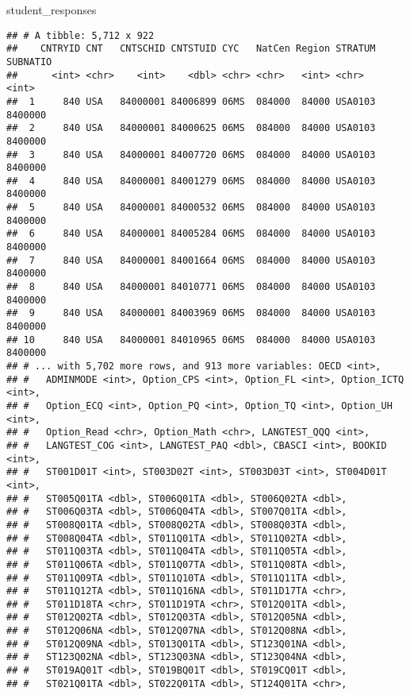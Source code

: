 \documentclass[]{article}
\newenvironment{Shaded}{\begin{snugshade}}{\end{snugshade}}
\newcommand{\NormalTok}[1]{#1}
\begin{document}
\begin{Shaded}
\begin{Highlighting}[]
\NormalTok{student_responses}
\end{Highlighting}
\end{Shaded}

\begin{verbatim}
## # A tibble: 5,712 x 922
##    CNTRYID CNT   CNTSCHID CNTSTUID CYC   NatCen Region STRATUM SUBNATIO
##      <int> <chr>    <int>    <dbl> <chr> <chr>   <int> <chr>      <int>
##  1     840 USA   84000001 84006899 06MS  084000  84000 USA0103  8400000
##  2     840 USA   84000001 84000625 06MS  084000  84000 USA0103  8400000
##  3     840 USA   84000001 84007720 06MS  084000  84000 USA0103  8400000
##  4     840 USA   84000001 84001279 06MS  084000  84000 USA0103  8400000
##  5     840 USA   84000001 84000532 06MS  084000  84000 USA0103  8400000
##  6     840 USA   84000001 84005284 06MS  084000  84000 USA0103  8400000
##  7     840 USA   84000001 84001664 06MS  084000  84000 USA0103  8400000
##  8     840 USA   84000001 84010771 06MS  084000  84000 USA0103  8400000
##  9     840 USA   84000001 84003969 06MS  084000  84000 USA0103  8400000
## 10     840 USA   84000001 84010965 06MS  084000  84000 USA0103  8400000
## # ... with 5,702 more rows, and 913 more variables: OECD <int>,
## #   ADMINMODE <int>, Option_CPS <int>, Option_FL <int>, Option_ICTQ <int>,
## #   Option_ECQ <int>, Option_PQ <int>, Option_TQ <int>, Option_UH <int>,
## #   Option_Read <chr>, Option_Math <chr>, LANGTEST_QQQ <int>,
## #   LANGTEST_COG <int>, LANGTEST_PAQ <dbl>, CBASCI <int>, BOOKID <int>,
## #   ST001D01T <int>, ST003D02T <int>, ST003D03T <int>, ST004D01T <int>,
## #   ST005Q01TA <dbl>, ST006Q01TA <dbl>, ST006Q02TA <dbl>,
## #   ST006Q03TA <dbl>, ST006Q04TA <dbl>, ST007Q01TA <dbl>,
## #   ST008Q01TA <dbl>, ST008Q02TA <dbl>, ST008Q03TA <dbl>,
## #   ST008Q04TA <dbl>, ST011Q01TA <dbl>, ST011Q02TA <dbl>,
## #   ST011Q03TA <dbl>, ST011Q04TA <dbl>, ST011Q05TA <dbl>,
## #   ST011Q06TA <dbl>, ST011Q07TA <dbl>, ST011Q08TA <dbl>,
## #   ST011Q09TA <dbl>, ST011Q10TA <dbl>, ST011Q11TA <dbl>,
## #   ST011Q12TA <dbl>, ST011Q16NA <dbl>, ST011D17TA <chr>,
## #   ST011D18TA <chr>, ST011D19TA <chr>, ST012Q01TA <dbl>,
## #   ST012Q02TA <dbl>, ST012Q03TA <dbl>, ST012Q05NA <dbl>,
## #   ST012Q06NA <dbl>, ST012Q07NA <dbl>, ST012Q08NA <dbl>,
## #   ST012Q09NA <dbl>, ST013Q01TA <dbl>, ST123Q01NA <dbl>,
## #   ST123Q02NA <dbl>, ST123Q03NA <dbl>, ST123Q04NA <dbl>,
## #   ST019AQ01T <dbl>, ST019BQ01T <dbl>, ST019CQ01T <dbl>,
## #   ST021Q01TA <dbl>, ST022Q01TA <dbl>, ST124Q01TA <chr>,

\end{verbatim}
\end{document}
